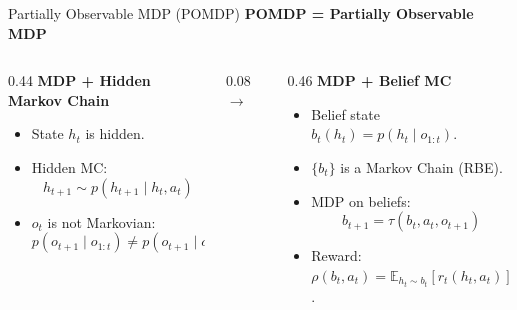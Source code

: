 \documentclass[18pt,aspectratio=149]{beamer}
\begin{document}
\begin{frame}{Partially Observable MDP (POMDP)}
    \centering
    \vspace{-0.2em}
    \textbf{POMDP = Partially Observable MDP}

    \vspace{0.6em}
    \begin{columns}[T,onlytextwidth]
        \begin{column}{0.44\textwidth}
            \centering
            \textbf{MDP + Hidden Markov Chain}
            \vspace{0.4em}
            \begin{itemize}
                \item State $h_t$ is hidden.
                \item Hidden MC:
                \vspace{-0.3em}
                \[
                    h_{t+1} \sim p(h_{t+1} \mid h_t, a_t)
                \]
                \item $o_t$ is not Markovian:
                \vspace{-0.3em}
                \[
                    p(o_{t+1} \mid o_{1:t}) \ne p(o_{t+1} \mid o_t)
                \]
            \end{itemize}
        \end{column}
        \begin{column}{0.08\textwidth}
            \centering
            \vspace{5.5em}
            {\Large $\longrightarrow$}
        \end{column}
        \begin{column}{0.46\textwidth}
            \centering
            \textbf{MDP + Belief MC}
            \vspace{0.4em}
            \begin{itemize}
                \item Belief state $b_t(h_t) = p(h_t \mid o_{1:t})$.
                \item $\{b_t\}$ is a Markov Chain (RBE).
                \item MDP on beliefs:
                \vspace{-0.5em}
                \[
                    b_{t+1} = \tau(b_t, a_t, o_{t+1})
                \]
                \item Reward: $\rho(b_t, a_t) = \mathbb{E}_{h_t \sim b_t}[r_t(h_t, a_t)]$.
            \end{itemize}
        \end{column}
    \end{columns}
\end{frame}
\end{document}
